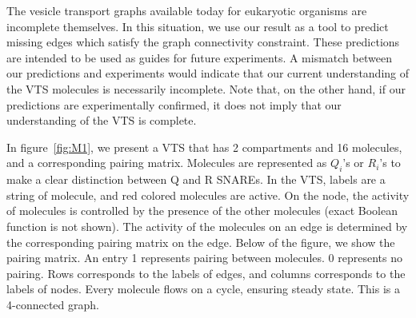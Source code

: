 The vesicle transport graphs available today for eukaryotic organisms are incomplete themselves. 
%
In this situation, we use our result as a tool to predict missing edges which satisfy the graph connectivity constraint. 
%
These predictions are intended to be used as guides for future experiments. 
%
A mismatch between our predictions and experiments would indicate that our current understanding of the VTS molecules is necessarily incomplete. 
%
Note that, on the other hand, if our predictions are experimentally confirmed, it does not imply that our understanding of the VTS is complete.\\
%
%
\begin{example}
%
In figure~\ref{fig:M1}, we present a VTS that has 2 compartments and 16 molecules, and a corresponding pairing matrix.
%
Molecules are represented as $Q_{i}$'s or $R_{i}$'s to make a clear distinction between Q and R SNAREs.
%
In the VTS, labels are a string of molecule, and red colored molecules are active.
%
On the node, the activity of molecules is controlled
by the presence of the other molecules (exact Boolean function is not shown). 
%
The activity of the molecules on an edge is determined by the corresponding pairing matrix on the edge.
%
Below of the figure, we show the pairing matrix.
%
An entry 1 represents pairing between molecules.
%
0 represents no pairing.
%
Rows corresponds to the labels of edges, and
columns corresponds to the labels of nodes.
%
Every molecule flows on a cycle, ensuring steady state.
%
This is a 4-connected graph.
\end{example}

